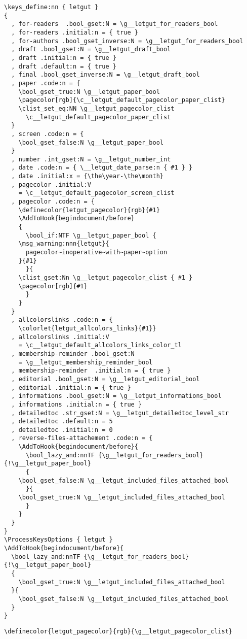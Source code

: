 \documentclass{letgut}
\begin{document}
\begin{lstlisting}
\keys_define:nn { letgut }
{
  , for-readers  .bool_gset:N = \g__letgut_for_readers_bool
  , for-readers .initial:n = { true }
  , for-authors .bool_gset_inverse:N = \g__letgut_for_readers_bool
  , draft .bool_gset:N = \g__letgut_draft_bool
  , draft .initial:n = { true }
  , draft .default:n = { true }
  , final .bool_gset_inverse:N = \g__letgut_draft_bool
  , paper .code:n = {
    \bool_gset_true:N \g__letgut_paper_bool
    \pagecolor[rgb]{\c__letgut_default_pagecolor_paper_clist}
    \clist_set_eq:NN \g__letgut_pagecolor_clist
      \c__letgut_default_pagecolor_paper_clist
  }
  , screen .code:n = {
    \bool_gset_false:N \g__letgut_paper_bool
  }
  , number .int_gset:N = \g__letgut_number_int
  , date .code:n = { \__letgut_date_parse:n { #1 } }
  , date .initial:x = {\the\year-\the\month}
  , pagecolor .initial:V
    = \c__letgut_default_pagecolor_screen_clist
  , pagecolor .code:n = {
    \definecolor{letgut_pagecolor}{rgb}{#1}
    \AddToHook{begindocument/before}
    {
      \bool_if:NTF \g__letgut_paper_bool {
	\msg_warning:nnn{letgut}{
	  pagecolor~inoperative~with~paper~option
	}{#1}
      }{
	\clist_gset:Nn \g__letgut_pagecolor_clist { #1 }
	\pagecolor[rgb]{#1}
      }
    }
  }
  , allcolorslinks .code:n = {
    \colorlet{letgut_allcolors_links}{#1}}
  , allcolorslinks .initial:V
    = \c__letgut_default_allcolors_links_color_tl
  , membership-reminder .bool_gset:N
    = \g__letgut_membership_reminder_bool
  , membership-reminder  .initial:n = { true }
  , editorial .bool_gset:N = \g__letgut_editorial_bool
  , editorial .initial:n = { true }
  , informations .bool_gset:N = \g__letgut_informations_bool
  , informations .initial:n = { true }
  , detailedtoc .str_gset:N = \g__letgut_detailedtoc_level_str
  , detailedtoc .default:n = 5
  , detailedtoc .initial:n = 0
  , reverse-files-attachement .code:n = {
    \AddToHook{begindocument/before}{
      \bool_lazy_and:nnTF {\g__letgut_for_readers_bool} {!\g__letgut_paper_bool}
      {
	\bool_gset_false:N \g__letgut_included_files_attached_bool
      }{
	\bool_gset_true:N \g__letgut_included_files_attached_bool
      }
    }
  }
}
\ProcessKeysOptions { letgut }
\AddToHook{begindocument/before}{
  \bool_lazy_and:nnTF {\g__letgut_for_readers_bool} {!\g__letgut_paper_bool}
  {
    \bool_gset_true:N \g__letgut_included_files_attached_bool
  }{
    \bool_gset_false:N \g__letgut_included_files_attached_bool
  }
}
\end{lstlisting}

\begin{lstlisting}
\definecolor{letgut_pagecolor}{rgb}{\g__letgut_pagecolor_clist}
\end{lstlisting}
\end{document}
